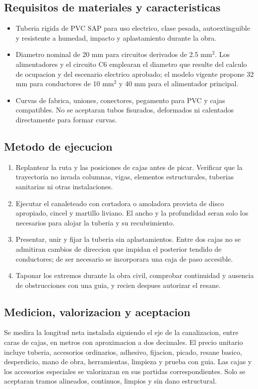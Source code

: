 \subsection{Requisitos de materiales y caracteristicas}
\begin{itemize}
  \item Tuberia rigida de PVC SAP para uso electrico, clase pesada, autoextinguible y
  resistente a humedad, impacto y aplastamiento durante la obra.
  \item Diametro nominal de 20 mm para circuitos derivados de 2.5 mm\(^2\). Los
  alimentadores y el circuito C6 emplearan el diametro que resulte del calculo de
  ocupacion y del escenario electrico aprobado; el modelo vigente propone 32 mm para
  conductores de 10 mm\(^2\) y 40 mm para el alimentador principal.
  \item Curvas de fabrica, uniones, conectores, pegamento para PVC y cajas compatibles.
  No se aceptaran tubos fisurados, deformados ni calentados directamente para formar
  curvas.
\end{itemize}

\subsection{Metodo de ejecucion}
\begin{enumerate}
  \item Replantear la ruta y las posiciones de cajas antes de picar. Verificar que la
  trayectoria no invada columnas, vigas, elementos estructurales, tuberias sanitarias
  ni otras instalaciones.
  \item Ejecutar el canaleteado con cortadora o amoladora provista de disco apropiado,
  cincel y martillo liviano. El ancho y la profundidad seran solo los necesarios para
  alojar la tuberia y su recubrimiento.
  \item Presentar, unir y fijar la tuberia sin aplastamientos. Entre dos cajas no se
  admitiran cambios de direccion que impidan el posterior tendido de conductores; de
  ser necesario se incorporara una caja de paso accesible.
  \item Taponar los extremos durante la obra civil, comprobar continuidad y ausencia
  de obstrucciones con una guia, y recien despues autorizar el resane.
\end{enumerate}

\subsection{Medicion, valorizacion y aceptacion}
Se medira la longitud neta instalada siguiendo el eje de la canalizacion, entre caras
de cajas, en metros con aproximacion a dos decimales. El precio unitario incluye
tuberia, accesorios ordinarios, adhesivo, fijacion, picado, resane basico, desperdicio,
mano de obra, herramientas, limpieza y prueba con guia. Las cajas y los accesorios
especiales se valorizaran en sus partidas correspondientes. Solo se aceptaran tramos
alineados, continuos, limpios y sin dano estructural.

